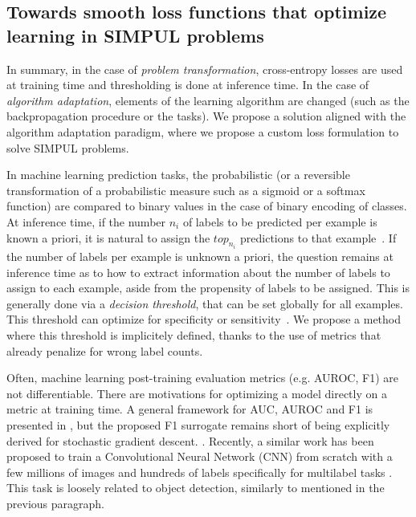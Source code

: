 \subsection{Towards smooth loss functions that optimize learning
in SIMPUL problems}
In summary, in the case of \emph{problem transformation},
cross-entropy losses are used at training time and thresholding is done at
inference time. In the case of \emph{algorithm adaptation}, elements of the
learning algorithm are changed (such as the backpropagation procedure or the
tasks). We propose a solution aligned with the algorithm adaptation paradigm,
where we propose a custom loss formulation to solve SIMPUL problems.

In machine learning prediction tasks, the probabilistic (or a reversible
transformation of a probabilistic measure such as a sigmoid or a softmax
function) are compared to binary values in the case of binary encoding of
classes. At inference time, if the number $n_i$ of labels to be predicted per
example is known a priori, it is natural to assign the $top_{n_i}$ predictions
to that example~\cite{lossTopKError, topKmulticlassSVM}. If the number of
labels per example is unknown a priori, the question remains at inference time
as to how to extract information about the number of labels to assign to each
example, aside from the propensity of labels to be assigned. This is generally
done via a \emph{decision threshold}, that can be set globally for all
examples. This threshold can optimize for specificity or
sensitivity~\cite{decisionThreshold}. We propose a method where this threshold
is implicitely defined, thanks to the use of metrics that already penalize for
wrong label counts.

Often, machine learning post-training evaluation metrics (e.g. AUROC, F1) are
not differentiable. There are motivations  for
optimizing a model directly on a metric at training time. A general framework
for AUC, AUROC and F1 is presented in \cite{optimizableLosses}, but the
proposed F1 surrogate remains short of being explicitly derived for stochastic
gradient descent. . Recently, a similar work has been proposed to train a
Convolutional Neural Network (CNN) from scratch with a few millions of images
and hundreds of labels specifically for multilabel tasks \cite{tencent}. This
task is loosely related to object detection, similarly to
\cite{multitaskLabelImages} mentioned in the previous paragraph.

